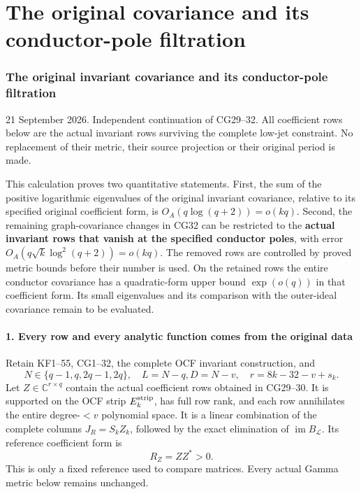 \documentclass[11pt]{article}
\begin{document}
\clearpage\part{The original covariance and its conductor-pole filtration}
\section{The original invariant covariance and its conductor-pole filtration}\label{the-original-invariant-covariance-and-its-conductor-pole-filtration}

21 September 2026. Independent continuation of CG29--32. All coefficient rows below are the actual invariant rows surviving the complete low-jet constraint. No replacement of their metric, their source projection or their original period is made.

This calculation proves two quantitative statements. First, the sum of the positive logarithmic eigenvalues of the original invariant covariance, relative to its specified original coefficient form, is \(O_A(q\log(q+2))=o(kq)\). Second, the remaining graph-covariance changes in CG32 can be restricted to the \textbf{actual invariant rows that vanish at the specified conductor poles}, with error \(O_A(q\sqrt{k}\log^2(q+2))=o(kq)\). The removed rows are controlled by proved metric bounds before their number is used. On the retained rows the entire conductor covariance has a quadratic-form upper bound \(\exp(o(q))\) in that coefficient form. Its small eigenvalues and its comparison with the outer-ideal covariance remain to be evaluated.

\subsection{1. Every row and every analytic function comes from the original data}\label{every-row-and-every-analytic-function-comes-from-the-original-data}

Retain KF1--55, CG1--32, the complete OCF invariant construction, and \[
N\in\{q-1,q,2q-1,2q\},\quad L=N-q,
D=N-v,\quad r=8k-32-v+s_k.
\tag{CGR1}
\] Let \(Z\in\mathbb C^{r\times q}\) contain the actual coefficient rows obtained in CG29--30. It is supported on the OCF strip \(E_k^{\rm strip}\), has full row rank, and each row annihilates the entire degree-\(<v\) polynomial space. It is a linear combination of the complete columns \(J_R=S_kZ_k\), followed by the exact elimination of \(\operatorname{im}B_{\mathcal L}\). Its reference coefficient form is \[
R_Z=ZZ^*>0.
\tag{CGR2}
\] This is only a fixed reference used to compare matrices. Every actual Gamma metric below remains unchanged.
\end{document}
